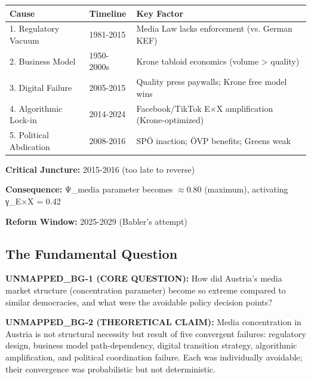 \begin{tcolorbox}[colback=yellow!5!white, colframe=yellow!75!black,
    title=Quick Reference: Five Causes of Austrian Concentration]

\begin{tabular}{@{}llp{6cm}@{}}
\textbf{Cause} & \textbf{Timeline} & \textbf{Key Factor} \\
\midrule
1. Regulatory Vacuum & 1981-2015 & Media Law lacks enforcement (vs. German KEF) \\
2. Business Model & 1950-2000s & Krone tabloid economics (volume > quality) \\
3. Digital Failure & 2005-2015 & Quality press paywalls; Krone free model wins \\
4. Algorithmic Lock-in & 2014-2024 & Facebook/TikTok E×X amplification (Krone-optimized) \\
5. Political Abdication & 2008-2016 & SPÖ inaction; ÖVP benefits; Greens weak \\
\end{tabular}

\textbf{Critical Juncture:} 2015-2016 (too late to reverse)

\textbf{Consequence:} Ψ_media parameter becomes $\approx$0.80 (maximum), activating γ_{E×X} = 0.42

\textbf{Reform Window:} 2025-2029 (Babler's attempt)

\end{tcolorbox}


\subsection*{The Fundamental Question}

\textbf{UNMAPPED_BG-1 (CORE QUESTION):} How did Austria's media market structure (concentration parameter) become
so extreme compared to similar democracies, and what were the avoidable policy decision points?

\textbf{UNMAPPED_BG-2 (THEORETICAL CLAIM):} Media concentration in Austria is not structural necessity but result
of five convergent failures: regulatory design, business model path-dependency, digital transition strategy,
algorithmic amplification, and political coordination failure. Each was individually avoidable; their convergence
was probabilistic but not deterministic.

